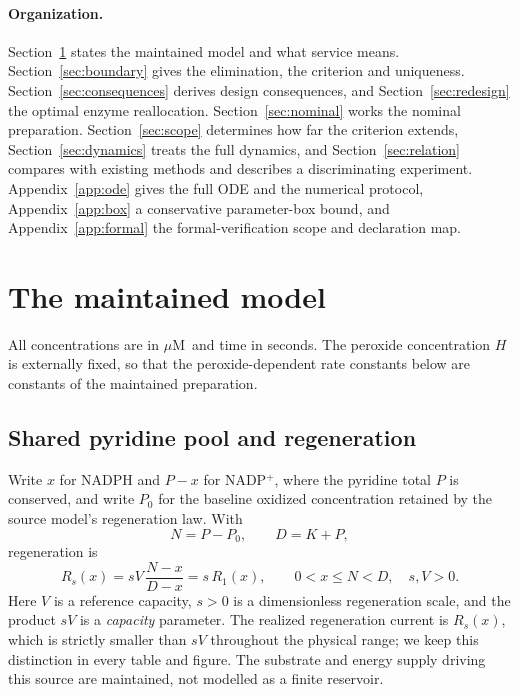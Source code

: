 \documentclass[11pt,a4paper]{article}
\theoremstyle{plain}
\theoremstyle{definition}
\theoremstyle{remark}
\newcommand{\uM}{\ensuremath{\mu\mathrm{M}}}
\begin{document}
\paragraph{Organization.}
Section~\ref{sec:model} states the maintained model and what service means.
Section~\ref{sec:boundary} gives the elimination, the criterion and uniqueness.
Section~\ref{sec:consequences} derives design consequences, and
Section~\ref{sec:redesign} the optimal enzyme reallocation.
Section~\ref{sec:nominal} works the nominal preparation.
Section~\ref{sec:scope} determines how far the criterion extends,
Section~\ref{sec:dynamics} treats the full dynamics, and
Section~\ref{sec:relation} compares with existing methods and describes a
discriminating experiment. Appendix~\ref{app:ode} gives the full ODE and the
numerical protocol, Appendix~\ref{app:box} a conservative parameter-box bound, and
Appendix~\ref{app:formal} the formal-verification scope and declaration map.

\section{The maintained model}\label{sec:model}

All concentrations are in \uM\ and time in seconds. The peroxide concentration $H$
is externally fixed, so that the peroxide-dependent rate constants below are
constants of the maintained preparation.

\subsection{Shared pyridine pool and regeneration}

Write $x$ for NADPH and $P-x$ for NADP$^+$, where the pyridine total $P$ is
conserved, and write $P_0$ for the baseline oxidized concentration retained by the
source model's regeneration law. With
\[
  N=P-P_0,\qquad D=K+P,
\]
regeneration is
\begin{equation}\label{eq:source}
  R_s(x)=sV\,\frac{N-x}{D-x}=s\,R_1(x),\qquad 0<x\le N<D,\quad s,V>0 .
\end{equation}
Here $V$ is a reference capacity, $s>0$ is a dimensionless regeneration scale, and
the product $sV$ is a \emph{capacity} parameter. The realized regeneration current
is $R_s(x)$, which is strictly smaller than $sV$ throughout the physical range; we
keep this distinction in every table and figure. The substrate and energy supply
driving this source are maintained, not modelled as a finite reservoir.
\end{document}
